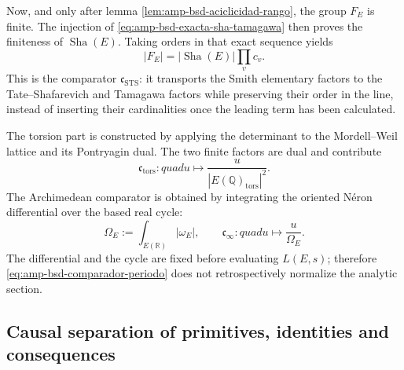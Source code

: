 Now, and only after lemma
\ref{lem:amp-bsd-aciclicidad-rango}, the group \(F_E\) is finite. The
injection of \eqref{eq:amp-bsd-exacta-sha-tamagawa} then proves the
finiteness of \(\operatorname{Sha}(E)\). Taking orders in that exact
sequence yields
\begin{equation}\label{eq:amp-bsd-cardinal-smith}
 |F_E|=|\operatorname{Sha}(E)|\prod_v c_v.
\end{equation}
This is the comparator
\(\mathfrak c_{\mathrm{STS}}\): it transports the Smith elementary factors
to the Tate--Shafarevich and Tamagawa factors while preserving their order in the line,
instead of inserting their cardinalities once the leading term has been calculated.

The torsion part is constructed by applying the determinant to the Mordell--Weil
lattice and its Pontryagin dual. The two finite factors are dual and
contribute
\begin{equation}\label{eq:amp-bsd-comparador-torsion}
 \mathfrak c_{\mathrm{tors}}:quad
 u\longmapsto
 \frac{u}{|E(\mathbb Q)_{\mathrm{tors}}|^2}.
\end{equation}
The Archimedean comparator is obtained by integrating the oriented Néron differential
over the based real cycle:
\begin{equation}\label{eq:amp-bsd-comparador-periodo}
 \Omega_E:=\int_{E(\mathbb R)}|\omega_E|,
 \qquad
 \mathfrak c_\infty:quad u\longmapsto\frac{u}{\Omega_E}.
\end{equation}
The differential and the cycle are fixed before evaluating \(L(E,s)\); therefore
\eqref{eq:amp-bsd-comparador-periodo} does not retrospectively normalize the
analytic section.

\subsection{Causal separation of primitives, identities and consequences}
\label{subsec:amp-bsd-separacion-causal}

